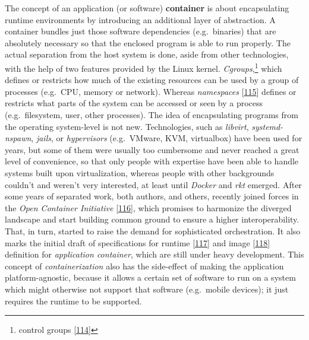 \documentclass[12pt,english,a4paper,titlepage,cleardoublepage=empty,dottedtoc]{report}
\begin{document}
The concept of an application (or software)
\textbf{\protect\hypertarget{def--container}{}{container}} is about
encapsulating runtime environments by introducing an additional layer of
abstraction. A container bundles just those software dependencies
(e.g.~binaries) that are absolutely necessary so that the enclosed
program is able to run properly. The actual separation from the host
system is done, aside from other technologies, with the help of two
features provided by the Linux kernel. \emph{Cgroups},\footnote{control
  groups {[}\protect\hyperlink{ref-web_2015_cgroup-doc}{114}{]}} which
defines or restricts how much of the existing resources can be used by a
group of processes (e.g.~CPU, memory or network). Whereas
\emph{namespaces}
{[}\protect\hyperlink{ref-web_2016_kernel-namespace}{115}{]} defines or
restricts what parts of the system can be accessed or seen by a process
(e.g.~filesystem, user, other processes). The idea of encapsulating
programs from the operating system-level is not new. Technologies, such
as \emph{libvirt}, \emph{systemd-nspawn}, \emph{jails}, or
\emph{hypervisors} (e.g.~VMware, KVM, virtualbox) have been used for
years, but some of them were usually too cumbersome and never reached a
great level of convenience, so that only people with expertise have been
able to handle systems built upon virtualization, whereas people with
other backgrounds couldn't and weren't very interested, at least until
\emph{Docker} and \emph{rkt} emerged. After some years of separated
work, both authors, and others, recently joined forces in the \emph{Open
Container Initiative}
{[}\protect\hyperlink{ref-web_2016_open-container-initiative}{116}{]},
which promises to harmonize the diverged landscape and start building
common ground to ensure a higher interoperability. That, in turn,
started to raise the demand for sophisticated orchestration. It also
marks the initial draft of specifications for runtime
{[}\protect\hyperlink{ref-web_oci-spec_runtime}{117}{]} and image
{[}\protect\hyperlink{ref-web_oci-spec_image}{118}{]} definition for
\emph{application container}, which are still under heavy development.
This concept of \emph{containerization} also has the side-effect of
making the application platform-agnostic, because it allows a certain
set of software to run on a system which might otherwise not support
that software (e.g.~mobile devices); it just requires the runtime to be
supported.
\end{document}
